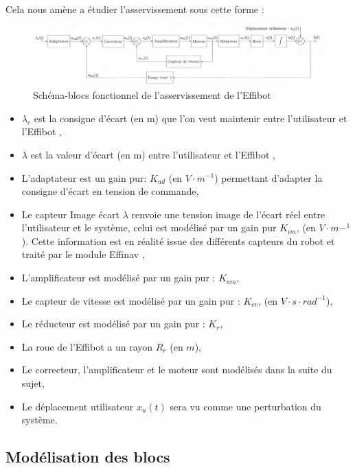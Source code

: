Cela nous amène a étudier l'asservissement sous cette forme :

\begin{figure}[ht!]
\begin{center}
 \includegraphics[width=0.9\linewidth]{img/fig03}
\end{center}
\caption{Schéma-blocs fonctionnel de l'asservissement de l'Effibot}
\label{fig03}
\end{figure}

\begin{itemize}
 \item $\lambda_c$ est la consigne d'écart (en m) que l'on veut maintenir entre l'utilisateur et l'\og Effibot \fg,
 \item $\lambda$ est la valeur d'écart (en m) entre l'utilisateur et l'\og Effibot \fg,
 \item L'adaptateur est un gain pur: $K_{ad}$ (en $V\cdot m^{-1}$) permettant d'adapter la consigne d'écart en tension de commande,
 \item Le capteur \og Image écart $\lambda$ \fg renvoie une tension image de l'écart réel entre l'utilisateur et le système, celui est modélisé par un gain pur $K_{im}$, (en $V\cdot m-^{1}$). Cette information est en réalité issue
des différents capteurs du robot et traité par le module \og Effinav \fg,
 \item L'amplificateur est modélisé par un gain pur : $K_{am}$,
 \item Le capteur de vitesse est modélisé par un gain pur : $K_{cv}$, (en $V\cdot s\cdot rad^{-1}$),
 \item Le réducteur est modélisé par un gain pur : $K_r$,
 \item La roue de l'\og Effibot \fg a un rayon $R_r$ (en $m$),
 \item Le correcteur, l'amplificateur et le moteur sont modélisés dans la suite du sujet,
 \item Le déplacement utilisateur $x_u(t)$ sera vu comme une perturbation du système.
\end{itemize}

\subsection{Modélisation des blocs}

